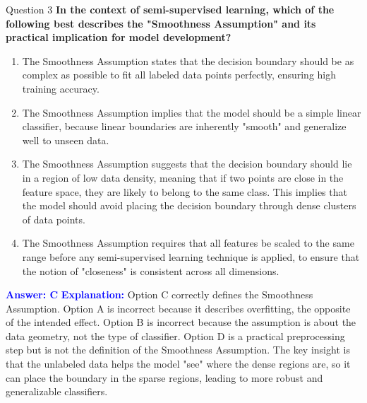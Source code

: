 \documentclass[8pt]{beamer}  %
\begin{document}
	\begin{frame}{Question 3}
		\textbf{In the context of semi-supervised learning, which of the following best describes the "Smoothness Assumption" and its practical implication for model development?}
		\begin{enumerate}
			\item The Smoothness Assumption states that the decision boundary should be as complex as possible to fit all labeled data points perfectly, ensuring high training accuracy.
			\item The Smoothness Assumption implies that the model should be a simple linear classifier, because linear boundaries are inherently "smooth" and generalize well to unseen data.
			\item The Smoothness Assumption suggests that the decision boundary should lie in a region of low data density, meaning that if two points are close in the feature space, they are likely to belong to the same class. This implies that the model should avoid placing the decision boundary through dense clusters of data points.
			\item The Smoothness Assumption requires that all features be scaled to the same range before any semi-supervised learning technique is applied, to ensure that the notion of "closeness" is consistent across all dimensions.
		\end{enumerate}
		\vspace{0.2cm}
		\textcolor{blue}{\textbf{Answer: C}}
		\vspace{0.2cm}
		\textcolor{blue}{\textbf{Explanation:}} Option C correctly defines the Smoothness Assumption. Option A is incorrect because it describes overfitting, the opposite of the intended effect. Option B is incorrect because the assumption is about the data geometry, not the type of classifier. Option D is a practical preprocessing step but is not the definition of the Smoothness Assumption. The key insight is that the unlabeled data helps the model "see" where the dense regions are, so it can place the boundary in the sparse regions, leading to more robust and generalizable classifiers.
	\end{frame}
	
\end{document}
